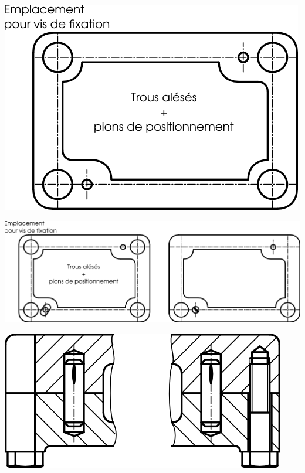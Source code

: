 \documentclass[11pt,oneside]{article}
\begin{document}
\noindent\begin{minipage}[c]{.3\linewidth}
\begin{center}
\includegraphics[width=.9\textwidth]{png/Fig19}
\end{center}
\end{minipage}\hfill
\noindent\begin{minipage}[c]{.65\linewidth}
\begin{center}
\includegraphics[width=\textwidth]{png/Fig21}
\end{center}
\end{minipage}

\vspace{.5cm}

\begin{center}
\begin{minipage}[c]{.3\linewidth}
\begin{center}
\includegraphics[width=.9\textwidth]{png/Fig18}
\end{center}
\end{minipage}
\end{center}
\end{document}
